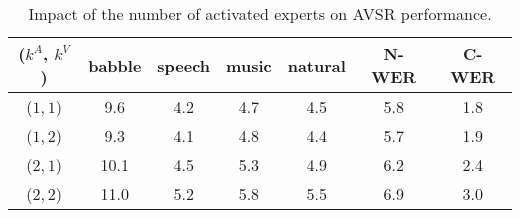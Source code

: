 \begin{wraptable}{r}{9.5cm}
    \vspace{-10pt}
    \centering
    \small
    \caption{Impact of the number of activated experts on AVSR performance.}
    \label{tab:num_experts}
    \vspace{3pt}
    \addtolength{\tabcolsep}{-1pt}
    \begin{tabular}{c|cccc|c|c}
        \toprule
        ($k^A$, $k^V$) & babble & speech & music & natural & N-WER & C-WER \\
        \midrule
        ($1, 1$) & 9.6 & 4.2 & 4.7 & 4.5 & 5.8 & 1.8 \\
        ($1, 2$) & 9.3 & 4.1 & 4.8 & 4.4 & 5.7 & 1.9 \\
        ($2, 1$) & 10.1 & 4.5 & 5.3 & 4.9 & 6.2 & 2.4 \\
        ($2, 2$) & 11.0 & 5.2 & 5.8 & 5.5 & 6.9 & 3.0 \\
        \bottomrule
    \end{tabular}
    \vspace{-5pt}
\end{wraptable}
